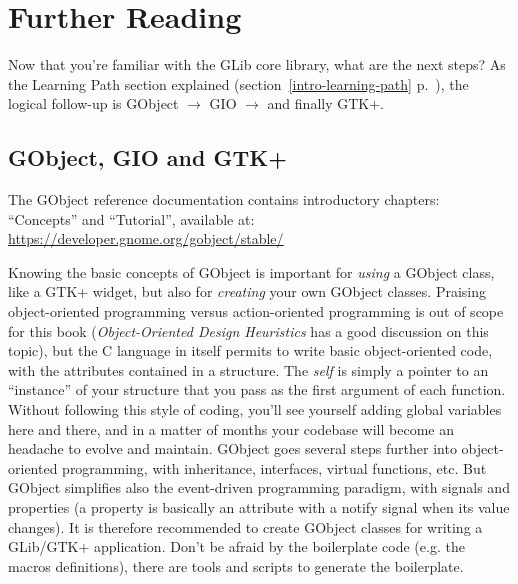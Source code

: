 \chapter{Further Reading}
\label{further-reading}

Now that you're familiar with the GLib core library, what are the next steps? As the Learning Path section explained (section~\ref{intro-learning-path} p.~\pageref{intro-learning-path}), the logical follow-up is GObject $\rightarrow$ GIO $\rightarrow$ and finally GTK+.

\section{GObject, GIO and GTK+}

The GObject reference documentation contains introductory chapters: ``Concepts'' and ``Tutorial'', available at:\\
\url{https://developer.gnome.org/gobject/stable/}

Knowing the basic concepts of GObject is important for \emph{using} a GObject class, like a GTK+ widget, but also for \emph{creating} your own GObject classes. Praising object-oriented programming versus action-oriented programming is out of scope for this book (\emph{Object-Oriented Design Heuristics} \cite{oop-book} has a good discussion on this topic), but the C language in itself permits to write basic object-oriented code, with the attributes contained in a structure. The \emph{self} is simply a pointer to an ``instance'' of your structure that you pass as the first argument of each function. Without following this style of coding, you'll see yourself adding global variables here and there, and in a matter of months your codebase will become an headache to evolve and maintain. GObject goes several steps further into object-oriented programming, with inheritance, interfaces, virtual functions, etc. But GObject simplifies also the event-driven programming paradigm, with signals and properties (a property is basically an attribute with a notify signal when its value changes). It is therefore recommended to create GObject classes for writing a GLib/GTK+ application. Don't be afraid by the boilerplate code (e.g. the macros definitions), there are tools and scripts to generate the boilerplate.

